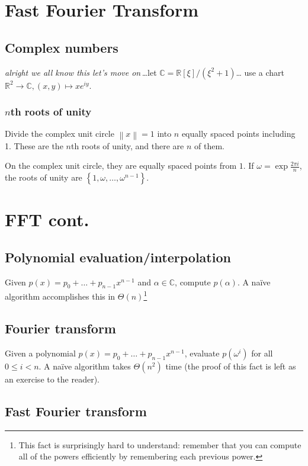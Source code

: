 \chapter{Fast Fourier Transform}
\section{Complex numbers}
\emph{alright we all know this let's move on\,\ldots}let \(\mathbb{C} = \mathbb{R}[\xi]/\left(\xi^2+1\right)\)\ldots%
use a chart \(\mathbb{R}^2\to\mathbb{C}, \left(x,y\right)\mapsto xe^{iy}\).

\subsection{\(n\)th roots of unity}
Divide the complex unit circle \(\left\|x\right\| = 1\) into \(n\) equally spaced points including 1.
These are the \(n\)th roots of unity, and there are \(n\) of them.

On the complex unit circle, they are equally spaced points from \(1\).
If \(\omega = \exp\frac{2\pi i}{n}\), the roots of unity are \(\left\{1, \omega, \ldots, \omega^{n - 1}\right\}\).

\chapter{FFT cont.}
\section{Polynomial evaluation/interpolation}
Given \(p(x) = p_0 + \ldots + p_{n - 1}x^{n - 1}\) and \(\alpha \in \mathbb{C}\), compute \(p(\alpha)\).
A na\"ive algorithm accomplishes this in \(\Theta(n)\)\footnote{This fact is surprisingly hard to understand: remember that you can compute all of the powers efficiently by remembering each previous power.}

\section{Fourier transform}
Given a polynomial \(p(x) = p_0 + \ldots + p_{n - 1}x^{n - 1}\), evaluate \(p(\omega^i)\) for all \(0 \leq i < n\). A na\"ive algorithm takes \(\Theta(n^2)\) time (the proof of this fact is left as an exercise to the reader).

\section{Fast Fourier transform}
